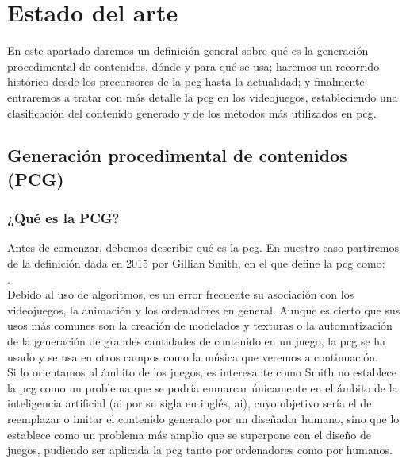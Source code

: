 \section{Estado del arte}

En este apartado daremos un definición general sobre qué es la generación procedimental de contenidos, dónde y para qué se usa; haremos un recorrido histórico desde los precursores de la \acrshort{pcg} hasta la actualidad; y finalmente entraremos a tratar con más detalle la \acrshort{pcg} en los videojuegos, estableciendo una clasificación del contenido generado y de los métodos más utilizados en \acrshort{pcg}.

\subsection{Generación procedimental de contenidos (PCG)}

\subsubsection{¿Qué es la PCG?}

Antes de comenzar, debemos describir qué es la \acrshort{pcg}. En nuestro caso partiremos de la definición dada en 2015 por Gillian Smith, en el que define la \acrshort{pcg} como: \\

\cite{smith2015}.\\

Debido al uso de algoritmos, es un error frecuente su asociación con los videojuegos, la animación y los ordenadores en general. Aunque es cierto que sus usos más comunes son la creación de modelados y texturas o la automatización de la generación de grandes cantidades de contenido en un juego, la \acrshort{pcg} se ha usado y se usa en otros campos como la música que veremos a continuación.\\

Si lo orientamos al ámbito de los juegos, es interesante como Smith \cite{smith2015} no establece la \acrshort{pcg} como un problema que se podría enmarcar únicamente en el ámbito de la inteligencia artificial (\acrshort{ai} por su sigla en inglés, \acrlong{ai}), cuyo objetivo sería el de reemplazar o imitar el contenido generado por un diseñador humano, sino que lo establece como un problema más amplio que se superpone con el diseño de juegos, pudiendo ser aplicada la \acrshort{pcg} tanto por ordenadores como por humanos.\\

